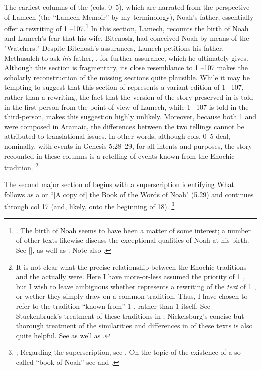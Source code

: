 The earliest columns of the \ga (cols. 0--5), which are narrated from the perspective of Lamech (the ``Lamech Memoir'' by my terminology), Noah's father, essentially offer a rewriting of 1 --107.\footnote{\cite[174]{nickelsburg2005}. The birth of Noah seems to have been a matter of some interest; a number of other texts likewise discuss the exceptional qualities of Noah at his birth. See [],  as well as \cite{vanderkam_kapera1992}. Note also \cite{stuckenbruck_berthelot-etal2010}.} In this section, Lamech, recounts the birth of Noah and Lamech's fear that his wife, Bitenosh, had conceived Noah by means of the  "Watchers." Despite Bitenosh's assurances, Lamech petitions his father, Methusaleh to ask \emph{his} father, \enoch, for further assurance, which he ultimately gives. Although this section is fragmentary, its close resemblance to 1 --107 makes the scholarly reconstruction of the missing sections quite plausible. While it may be tempting to suggest that this section of \ga represents a variant edition of 1 --107, rather than a rewriting, the fact that the version of the story preserved in \ga is told in the first-person from the point of view of Lamech, while 1 --107 is told in the third-person, makes this suggestion highly unlikely. Moreover, because both 1 \enoch and \ga were composed in Aramaic, the differences between the two tellings cannot be attributed to translational issues. In other words, although cols. 0--5 deal, nominally, with events in Genesis 5:28--29, for all intents and purposes, the story recounted in these columns is a retelling of events known from the Enochic tradition.%
%
\footnote{It is not clear what the precise relationship between the Enochic traditions and the \ga actually were. Here I have more-or-less assumed the priority of 1 \enoch, but I wish to leave ambiguous whether \ga represents a rewriting of the \emph{text} of 1 \enoch, or wether they simply draw on a common tradition. Thus, I have chosen to refer to the tradition ``known from'' 1 \enoch, rather than 1 \enoch itself. See Stuckenbruck's treatment of these traditions in \cite*{stuckenbruck_berthelot-etal2010}; Nickelsburg's concise but thorough treatment of the similarities and differences in of these texts is also quite helpful. See \cite[173--174]{nickelsburg2005} as well as \cite[122--123]{fitzmyer2004}.} 


The second major section of \ga begins with a superscription identifying What follows as a  or ``[A copy of] the Book of the Words of Noah" (5.29) and continues through col 17 (and, likely, onto the beginning of 18).%
%
\footnote{\cite[174--175]{nickelsburg2005}; Regarding the superscription, see \cite{steiner_dsd1995}. On the topic of the existence of a so-called ``book of Noah'' see \cite{dimant_vanderkam-etal2006} and \cite{werman_chazon-etal1999}.}

